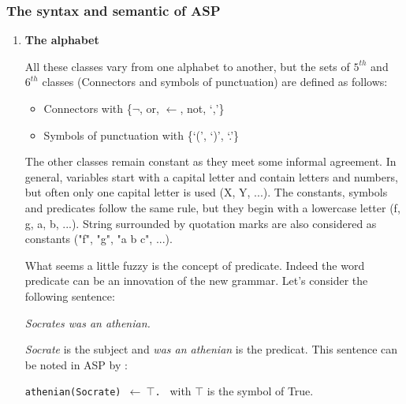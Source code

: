 \subsubsection{The syntax and semantic of ASP}
\label{sectionSyntaxeASP}
\begin{enumerate}
\item \textbf{The alphabet}

All these classes vary from one alphabet to another, but the sets of $ 5^{th} $ and $ 6^{th} $ classes (Connectors and symbols of punctuation) are defined as follows:
\begin{itemize}
  \item Connectors with \{$\neg$, or, $\leftarrow$, not, ‘,’\}
  \item Symbols of punctuation with \{‘(’, ‘)’, ‘.’\}
\end{itemize}

The other classes remain constant as they meet some informal agreement. In general, variables start with a capital letter and contain letters and numbers, but often only one capital letter is used (\eg X, Y, ...).
The constants, symbols and predicates follow the same rule, but they begin with a lowercase letter (\eg f, g, a, b, ...).
String surrounded by quotation marks are also considered as constants (\eg "f", "g", "a b c", ...).

What seems a little fuzzy is the concept of predicate. Indeed the word predicate can be an innovation of the new grammar. Let's consider the following sentence: 
\begin{tabbing}
 \textit{Socrates was an athenian.} 
\end{tabbing}
\textit{Socrate} is the subject and \textit{was an athenian} is the predicat. This sentence can be noted in ASP by :
\begin{tabbing}
 \texttt{athenian(Socrate) $\leftarrow ~ \top$. }\hspace{2cm} with \texttt{$\top$}  is the symbol of True.
\end{tabbing} 


\end{enumerate}
